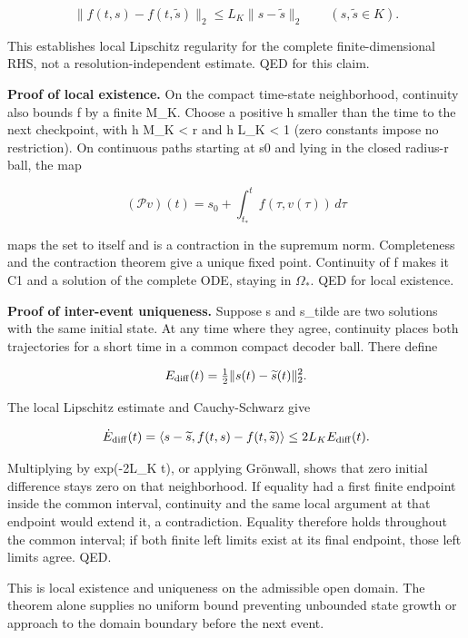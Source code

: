 \documentclass[11pt,a4paper]{article}
\begin{document}
\[
\|f(t,s)-f(t,\widetilde s)\|_2\le L_K\|s-\widetilde s\|_2
\qquad(s,\widetilde s\in K).
\]



This establishes local Lipschitz regularity for the complete finite-dimensional RHS, not a resolution-independent estimate. QED for this claim.

\textbf{Proof of local existence.} On the compact time-state neighborhood, continuity also bounds f by a finite M\_K. Choose a positive h smaller than the time to the next checkpoint, with h M\_K < r and h L\_K < 1 (zero constants impose no restriction). On continuous paths starting at s0 and lying in the closed radius-r ball, the map



\[
(\mathcal Pv)(t)=s_0+\int_{t_*}^{t}f(\tau,v(\tau))\,d\tau
\]



maps the set to itself and is a contraction in the supremum norm. Completeness and the contraction theorem give a unique fixed point. Continuity of f makes it C1 and a solution of the complete ODE, staying in \(\Omega_*\). QED for local existence.

\textbf{Proof of inter-event uniqueness.} Suppose s and s\_tilde are two solutions with the same initial state. At any time where they agree, continuity places both trajectories for a short time in a common compact decoder ball. There define



\[
E_{\rm diff}(t)=\tfrac12\|s(t)-\widetilde s(t)\|_2^2.
\]



The local Lipschitz estimate and Cauchy-Schwarz give



\[
\dot E_{\rm diff}(t)
=\langle s-\widetilde s,f(t,s)-f(t,\widetilde s)\rangle
\le2L_KE_{\rm diff}(t).
\]



Multiplying by exp(-2L\_K t), or applying Grönwall, shows that zero initial difference stays zero on that neighborhood. If equality had a first finite endpoint inside the common interval, continuity and the same local argument at that endpoint would extend it, a contradiction. Equality therefore holds throughout the common interval; if both finite left limits exist at its final endpoint, those left limits agree. QED.

This is local existence and uniqueness on the admissible open domain. The theorem alone supplies no uniform bound preventing unbounded state growth or approach to the domain boundary before the next event.
\end{document}

